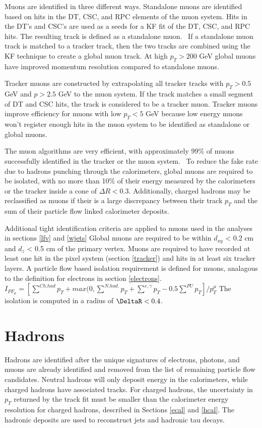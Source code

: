 \documentclass[oneside, letterpaper, oldfontcommands]{memoir}
\begin{document}
\qquad Muons are identified in three different ways. Standalone muons are identified based on hits in the DT, CSC, and RPC elements of the muon system. Hits in the DT's and CSC's are used as a seeds for a KF fit of the DT, CSC, and RPC hits. The resulting track is defined as a standalone muon.~\cite{Chatrchyan:2013sba} If a standalone muon track is matched to a tracker track, then the two tracks are combined using the KF technique to create a global muon track. At high $p_{T} > 200$ GeV global muons have improved momentum resolution compared to standalone muons.

\qquad Tracker muons are constructed by extrapolating all tracker tracks with $p_{T} > 0.5$ GeV and $p > 2.5$ GeV to the muon system. If the track matches a small segment of DT and CSC hits, the track is considered to be a tracker muon. Tracker muons improve efficiency for muons with low $p_{T} < 5$ GeV because low energy muons won't register enough hits in the muon system to be identified as standalone or global muons.

\qquad The muon algorithms are very efficient, with approximately 99$\%$ of muons successfully identified in the tracker or the muon system.~\cite{Chatrchyan:2013sba} To reduce the fake rate due to hadrons punching through the calorimeters, global muons are required to be isolated, with no more than 10$\%$ of their energy measured by the calorimeters or the tracker inside a cone of $\Delta R < 0.3$. Additionally, charged hadrons may be reclassified as muons if their is a large discrepancy between their track $p_{T}$ and the sum of their particle flow linked calorimeter deposits. 

\qquad Additional tight identification criteria are applied to muons used in the analyses in sections \ref{lfv} and \ref{wjets} Global muons are required to be within $d_{xy}$ < 0.2 cm and $d_{z}$ < 0.5 cm of the primary vertex. Muons are required to have recorded at least one hit in the pixel system (section \ref{tracker}) and hits in at least six tracker layers. A particle flow based isolation requirement is defined for muons, analagous to the definition for electrons in section \ref{electrons}. $I_{PF_{\mu}} = [\sum\limits^{Ch. had} p_{T} + max(0, \sum\limits^{N. had.} p_{T} + \sum\limits^{e,\gamma} p_{T} - 0.5 \sum\limits^{PU} p_{T}]/p_{T}^{\mu}$ The isolation is computed in a radius of $\DeltaR < 0.4$. 


\section{Hadrons}\label{hadrons}
Hadrons are identified after the unique signatures of electrons, photons, and muons are already identified and removed from the list of remaining particle flow candidates. Neutral hadrons will only deposit energy in the calorimeters, while charged hadrons have associated tracks. For charged hadrons, the uncertainty in $p_{T}$ returned by the track fit must be smaller than the calorimeter energy resolution for charged hadrons, described in Sections \ref{ecal} and \ref{hcal}. The hadronic deposits are used to reconstruct jets and hadronic tau decays.
\end{document}
